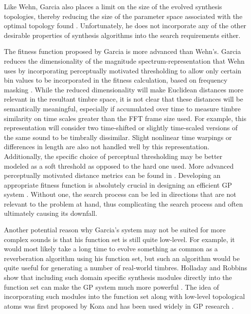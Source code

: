 \documentclass[a4paper,12pt]{report} 	%
\numberwithin{figure}{chapter}
\numberwithin{table}{chapter}
\numberwithin{equation}{chapter}
\begin{document}
\begin{flushleft}
Like Wehn, Garcia also places a limit on the size of the evolved synthesis topologies, thereby reducing the size of the parameter space associated with the optimal topology found \cite[p. 87]{Garcia:2001jw}. Unfortunately, he does not incorporate any of the other desirable properties of synthesis algorithms into the search requirements either.

The fitness function proposed by Garcia is more advanced than Wehn's. Garcia reduces the dimensionality of the magnitude spectrum-representation that Wehn uses by incorporating perceptually motivated thresholding to allow only certain bin values to be incorporated in the fitness calculation, based on frequency masking \cite[p. 6]{Garcia:2002cq}. While the reduced dimensionality will make Euclidean distances more relevant in the resultant timbre space, it is not clear that these distances will be semantically meaningful, especially if accumulated over time to measure timbre similarity on time scales greater than the FFT frame size used. For example, this representation will consider two time-shifted or slightly time-scaled versions of the same sound to be timbrally dissimilar. Slight nonlinear time warpings or differences in length are also not handled well by this representation. Additionally, the specific choice of perceptual thresholding may be better modeled as a soft threshold as opposed to the hard one used. More advanced perceptually motivated distance metrics can be found in \cite{Riionheimo:2003qo, Jehan:2005fy}. Developing an appropriate fitness function is absolutely crucial in designing an efficient GP system \cite[p. 3]{McDermott:2006ud}. Without one, the search process can be led in directions that are not relevant to the problem at hand, thus complicating the search process and often ultimately causing its downfall.

Another potential reason why Garcia's system may not be suited for more complex sounds is that his function set is still quite low-level. For example, it would most likely take a long time to evolve something as common as a reverberation algorithm using his function set, but such an algorithm would be quite useful for generating a number of real-world timbres. Holladay and Robbins show that including such domain specific synthesis modules directly into the function set can make the GP system much more powerful \cite[p. 4]{Holladay:2007ct}. The idea of incorporating such modules into the function set along with low-level topological atoms was first proposed by Koza and has been used widely in GP research \cite{Koza:1992gp}.


\end{flushleft}
\end{document}
